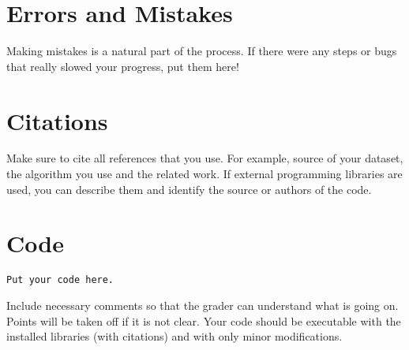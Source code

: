 \documentclass[12pt]{article}
\theoremstyle{definition}
\begin{document}
\section{Errors and Mistakes}
Making mistakes is a natural part of the process. If there were any steps or bugs that really slowed your progress, put them here!

\section*{Citations}
Make sure to cite all references that you use. For example, source of your dataset, the algorithm you use and the related work. If external programming libraries are used, you can describe them and identify the source or authors of the code.

\section*{Code}
\begin{lstlisting}
Put your code here.
\end{lstlisting}
Include necessary comments so that the grader can understand what is going on. Points will be taken off if it is not clear. Your code should be executable with the installed libraries (with citations) and with only minor modifications.
\end{document}
